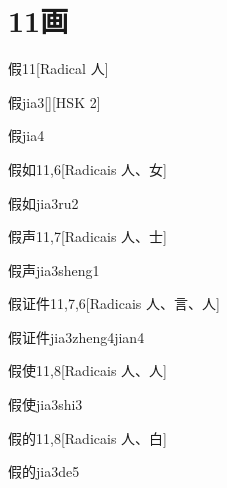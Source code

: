 
\section*{11画}

\begin{entry}{假}{11}[Radical ⼈]
  \begin{phonetics}{假}{jia3}[][HSK 2]
  \end{phonetics}
  \begin{phonetics}{假}{jia4}
  \end{phonetics}
\end{entry}

\begin{entry}{假如}{11,6}[Radicais ⼈、⼥]
  \begin{phonetics}{假如}{jia3ru2}
  \end{phonetics}
\end{entry}

\begin{entry}{假声}{11,7}[Radicais ⼈、⼠]
  \begin{phonetics}{假声}{jia3sheng1}
  \end{phonetics}
\end{entry}

\begin{entry}{假证件}{11,7,6}[Radicais ⼈、⾔、⼈]
  \begin{phonetics}{假证件}{jia3zheng4jian4}
  \end{phonetics}
\end{entry}

\begin{entry}{假使}{11,8}[Radicais ⼈、⼈]
  \begin{phonetics}{假使}{jia3shi3}
  \end{phonetics}
\end{entry}

\begin{entry}{假的}{11,8}[Radicais ⼈、⽩]
  \begin{phonetics}{假的}{jia3de5}
  \end{phonetics}
\end{entry}

